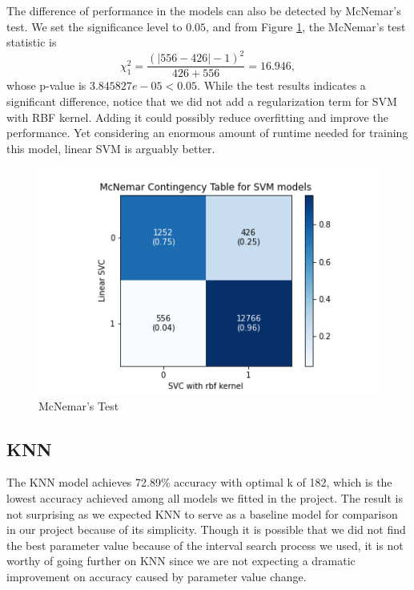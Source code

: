 \documentclass[10pt,twocolumn,letterpaper]{article}
\begin{document}
	The difference of performance in the models can also be detected by McNemar's test.  We set the significance level to $0.05$, and from Figure \ref{McNemar_SVM}, the McNemar's test statistic is $$\chi^2_{1} = \frac{(|556-426|-1)^2}{426+556} = 16.946,$$ whose p-value is $3.845827e-05 < 0.05$. While the test results indicates a significant difference, notice that we did not add a regularization term for SVM with RBF kernel. Adding it could possibly reduce overfitting and improve the performance. Yet considering an enormous amount of runtime needed for training this model, linear SVM is arguably better. 
	\begin{figure}[H]
		\includegraphics[width=\columnwidth]{McNemar_SVM}
		\caption{McNemar's Test}\label{McNemar_SVM}
	\end{figure} 
	\subsection{KNN}
	The KNN model achieves 72.89\% accuracy with optimal k of 182, which is the lowest accuracy achieved among all models we fitted in the project. The result is not surprising as we expected KNN to serve as a baseline model for comparison in our project because of its simplicity. Though it is possible that we did not find the best parameter value because of the interval search process we used, it is not worthy of going further on KNN since we are not expecting a dramatic improvement on accuracy caused by parameter value change.
\end{document}
